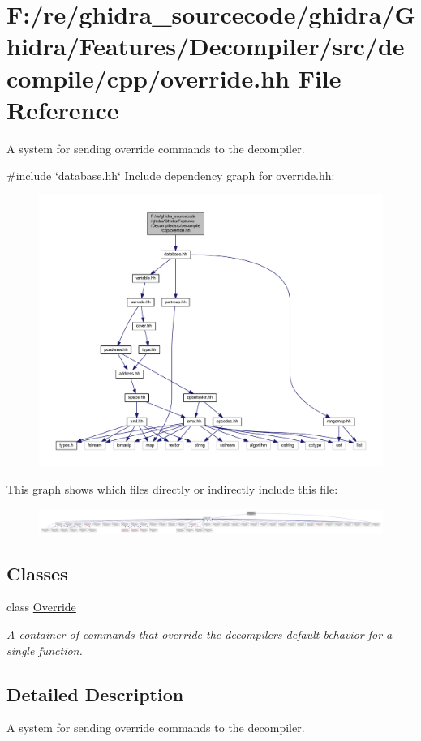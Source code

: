\hypertarget{override_8hh}{}\section{F\+:/re/ghidra\+\_\+sourcecode/ghidra/\+Ghidra/\+Features/\+Decompiler/src/decompile/cpp/override.hh File Reference}
\label{override_8hh}


A system for sending override commands to the decompiler.  


{\ttfamily \#include \char`\"{}database.\+hh\char`\"{}}\newline
Include dependency graph for override.\+hh\+:
\nopagebreak
\begin{figure}[H]
\begin{center}
\leavevmode
\includegraphics[width=350pt]{override_8hh__incl}
\end{center}
\end{figure}
This graph shows which files directly or indirectly include this file\+:
\nopagebreak
\begin{figure}[H]
\begin{center}
\leavevmode
\includegraphics[width=350pt]{override_8hh__dep__incl}
\end{center}
\end{figure}
\subsection*{Classes}
\begin{DoxyCompactItemize}
\item 
class \mbox{\hyperlink{class_override}{Override}}
\begin{DoxyCompactList}\small\item\em A container of commands that override the decompiler\textquotesingle{}s default behavior for a single function. \end{DoxyCompactList}\end{DoxyCompactItemize}


\subsection{Detailed Description}
A system for sending override commands to the decompiler. 

